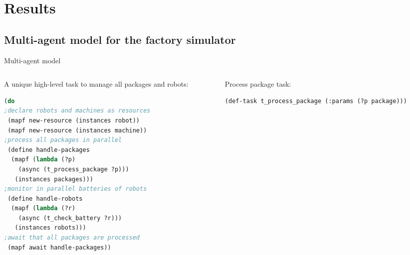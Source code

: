 \section{Results}
\subsection{Multi-agent model for the factory simulator}

\begin{frame}[fragile]{Multi-agent model}
            
            
\begin{columns}[t]
    \begin{column}{0.5\textwidth}
        A unique high-level task to manage all packages and robots:

    \scriptsize
    \setlength{\leftmargini}{0pt}
    \lstset{columns=fullflexible}
\begin{lstlisting}[language = lisp]
(do
;declare robots and machines as resources
 (mapf new-resource (instances robot))
 (mapf new-resource (instances machine))
;process all packages in parallel
 (define handle-packages
  (mapf (lambda (?p)
    (async (t_process_package ?p)))
   (instances packages)))
;monitor in parallel batteries of robots
 (define handle-robots
  (mapf (lambda (?r)
    (async (t_check_battery ?r)))
   (instances robots)))
;await that all packages are processed
 (mapf await handle-packages))
        \end{lstlisting}           
    \end{column}

\pause
    \begin{column}{0.5\textwidth}
        Process package task:
        \tiny
        \setlength{\leftmargini}{0pt}
        \lstset{columns=fullflexible}
        \begin{lstlisting}
(def-task t_process_package (:params (?p package)))


\end{lstlisting}
\end{column}
\end{columns}
\end{frame}
